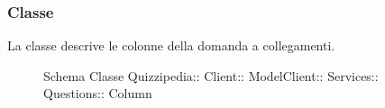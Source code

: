 \subsubsection{Classe }
La classe descrive le colonne della domanda a collegamenti.
\begin{figure}[H]
\centering
\noindent{}
\caption[Schema Classe Column]{Schema Classe Quizzipedia:: Client:: ModelClient:: Services:: Questions:: Column}
\end{figure}

